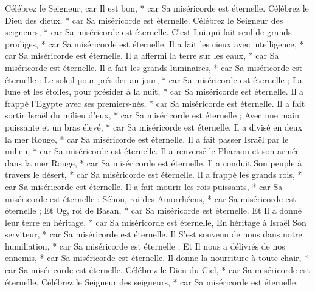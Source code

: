  Célébrez le Seigneur, car Il est bon, * car Sa miséricorde est éternelle.
\versseparator
 Célébrez le Dieu des dieux, * car Sa miséricorde est éternelle.
\versseparator
 Célébrez le Seigneur des seigneurs, * car Sa miséricorde est éternelle.
\versseparator
 C'est Lui qui fait seul de grands prodiges, * car Sa miséricorde est éternelle.
\versseparator
 Il a fait les cieux avec intelligence, * car Sa miséricorde est éternelle.
\versseparator
 Il a affermi la terre sur les eaux, * car Sa miséricorde est éternelle.
\versseparator
 Il a fait les grands luminaires, * car Sa miséricorde est éternelle :
\versseparator
 Le soleil pour présider au jour, * car Sa miséricorde est éternelle ;
\versseparator
 La lune et les étoiles, pour présider à la nuit, * car Sa miséricorde est éternelle.
\versseparator
 Il a frappé l'Egypte avec ses premiers-nés, * car Sa miséricorde est éternelle.
\versseparator
 Il a fait sortir Israël du milieu d'eux, * car Sa miséricorde est éternelle ;
\versseparator
 Avec une main puissante et un bras élevé, * car Sa miséricorde est éternelle.
\versseparator
 Il a divisé en deux la mer Rouge, * car Sa miséricorde est éternelle.
\versseparator
 Il a fait passer Israël par le milieu, * car Sa miséricorde est éternelle.
\versseparator
 Il a renversé le Pharaon et son armée dans la mer Rouge, * car Sa miséricorde est éternelle.
\versseparator
 Il a conduit Son peuple à travers le désert, * car Sa miséricorde est éternelle.
\versseparator
 Il a frappé les grands rois, * car Sa miséricorde est éternelle.
\versseparator
 Il a fait mourir les rois puissants, * car Sa miséricorde est éternelle :
\versseparator
 Séhon, roi des Amorrhéens, * car Sa miséricorde est éternelle ;
\versseparator
 Et Og, roi de Basan, * car Sa miséricorde est éternelle.
\versseparator
 Et Il a donné leur terre en héritage, * car Sa miséricorde est éternelle,
\versseparator
 En héritage à Israël Son serviteur, * car Sa miséricorde est éternelle.
\versseparator
 Il S'est souvenu de nous dans notre humiliation, * car Sa miséricorde est éternelle ;
\versseparator
 Et Il nous a délivrés de nos ennemis, * car Sa miséricorde est éternelle.
\versseparator
 Il donne la nourriture à toute chair, * car Sa miséricorde est éternelle.
\versseparator
 Célébrez le Dieu du Ciel, * car Sa miséricorde est éternelle.
\versseparator
 Célébrez le Seigneur des seigneurs, * car Sa miséricorde est éternelle.